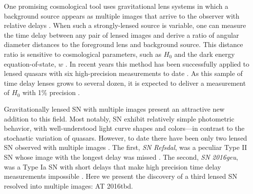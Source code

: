 \documentclass[12pt]{article}
\def\SNABC{AT 2016tbd\xspace}
\begin{document}
One promising cosmological tool uses %
gravitational lens systems in which a background
source appears as multiple images that arrive to the observer with relative delays \cite{einstein_lens_1936}.
When such a strongly-lensed source is variable, one can measure the time delay between any pair of lensed images and derive a ratio of angular diameter distances to the foreground lens and background source. 
This distance ratio is sensitive to cosmological parameters, such as 
$H_0$ \cite{refsdal_possibility_1964} and the dark energy equation-of-state, $w$ \cite{coe_cosmological_2009}.%
In recent years this method has been successfully applied to lensed
quasars %
with six high-precision measurements to date \cite{wong_h0licow_2019}. As this sample of time delay lenses grows to several dozen, it is expected to deliver a measurement of $H_0$ with 1\% precision \cite{suyu_cosmological_2018}. 

Gravitationally lensed SN with multiple images present an attractive new addition to this field. Most notably, SN exhibit relatively simple photometric behavior, with well-understood light curve shapes and colors---in contrast to the stochastic variation of quasars.  However,  to date there have been only two lensed SN observed with multiple images \cite{kelly_multiple_2015,goobar_iptf16geu:_2017}. The first, {\it SN Refsdal}, was a peculiar Type II SN whose image with the longest delay was missed \cite{kelly_sn_2016}. The second, {\it SN 2016geu}, was a Type Ia SN with short delays that make high precision time delay measurements impossible \cite{dhawan_magnification_2019}.   Here we present the discovery 
of a third lensed SN resolved into multiple images: \SNABC. 
\end{document}
